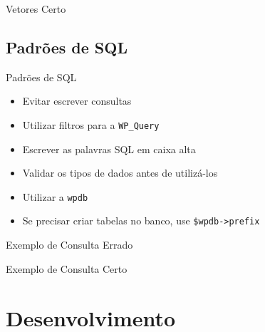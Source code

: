 \documentclass{beamer}
\begin{document}
\begin{frame}{Vetores}
  Certo
  
\end{frame}

\subsection{Padrões de SQL}

\begin{frame}{Padrões de SQL}
\begin{itemize}
  \pause \item Evitar escrever consultas
  \pause \item Utilizar filtros para a \texttt{WP\_Query}
  \pause \item Escrever as palavras SQL em caixa alta
  \pause \item Validar os tipos de dados antes de utilizá-los
  \pause \item Utilizar a \texttt{wpdb}
  \pause \item Se precisar criar tabelas no banco, use \texttt{\$wpdb->prefix}
\end{itemize}
\end{frame}

\begin{frame}{Exemplo de Consulta}
  Errado
  
\end{frame}

\begin{frame}{Exemplo de Consulta}
  Certo
  
\end{frame}

\section{Desenvolvimento}

\begin{frame}\end{frame}
\end{document}
